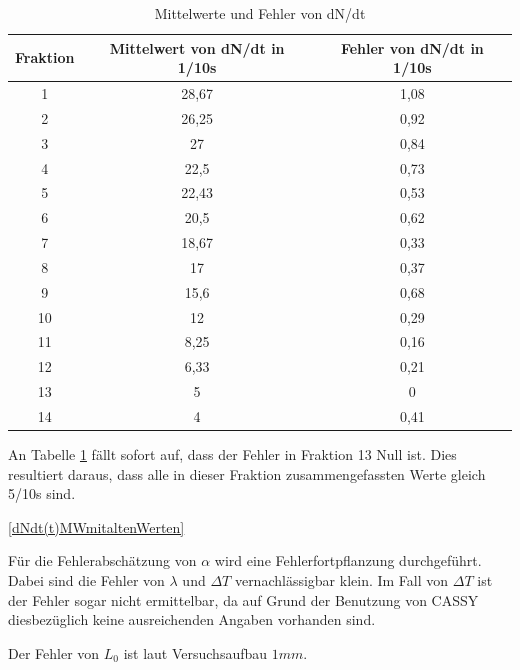 \begin{table}
\begin{tabular}{|c|c|c|}

\hline
Fraktion	&Mittelwert von dN/dt in 1/10s	&Fehler von dN/dt in 1/10s \\
\hline
1		&28,67				&1,08\\
\hline
2		&26,25				&0,92\\
\hline
3		&27					&0,84\\
\hline
4		&22,5				&0,73\\
\hline
5		&22,43				&0,53\\
\hline
6		&20,5				&0,62\\
\hline
7		&18,67				&0,33\\
\hline
8		&17					&0,37\\
\hline
9		&15,6				&0,68\\
\hline
10		&12					&0,29\\
\hline
11		&8,25				&0,16\\
\hline
12		&6,33				&0,21\\
\hline
13		&5					&0\\
\hline
14		&4					&0,41\\
\hline
\end{tabular}
\caption{Mittelwerte und Fehler von dN/dt}
\label{tbl_3}
\end{table}


An Tabelle \ref{tbl_3} fällt sofort auf, dass der Fehler in Fraktion 13 Null ist. Dies resultiert daraus, dass alle in dieser Fraktion zusammengefassten Werte gleich 5/10s sind.

\ref{dNdt(t)MWmitaltenWerten}

Für die Fehlerabschätzung von $ \alpha $ wird eine Fehlerfortpflanzung durchgeführt.
Dabei sind die Fehler von $ \lambda $  und  $ \Delta T $ vernachlässigbar klein. Im Fall von $ \Delta T $ ist der Fehler sogar nicht ermittelbar, da auf Grund der Benutzung von CASSY diesbezüglich keine ausreichenden Angaben vorhanden sind.

Der Fehler von $ L_{0} $ ist laut Versuchsaufbau $ 1 mm $.

